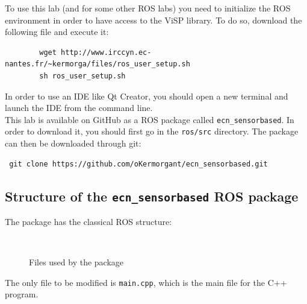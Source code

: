 \documentclass{ecnreport}
\begin{document}
To use this lab (and for some other ROS labs) you need to initialize the ROS environment in order to have access to the ViSP library.
To do so, download the following file and execute it:
\begin{center}\cppstyle
\begin{lstlisting}
        wget http://www.irccyn.ec-nantes.fr/~kermorga/files/ros_user_setup.sh
        sh ros_user_setup.sh
\end{lstlisting}
\end{center}In order to use an IDE like Qt Creator, you should open a new terminal and launch the IDE from the command line.\\

This lab is available on GitHub as a ROS package called \texttt{ecn\_sensorbased}. In order to download it, you should first go in the \texttt{ros/src} directory. The package can then be downloaded through git:
\begin{center}\cppstyle
\begin{lstlisting}
 git clone https://github.com/oKermorgant/ecn_sensorbased.git
\end{lstlisting}
\end{center}

\subsection{Structure of the \texttt{ecn\_sensorbased} ROS package}

The package has the classical ROS structure:
\begin{figure}[h]
\begin{minipage}{.25\linewidth} ~ \end{minipage}
\begin{minipage}{.5\linewidth}
\end{minipage}
\caption{Files used by the package}
\end{figure}

The only file to be modified is \texttt{main.cpp}, which is the main file for the C++ program.
\end{document}
